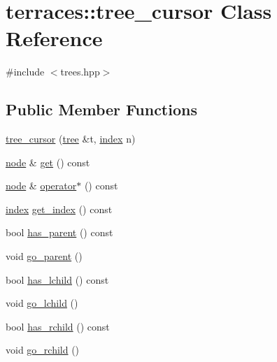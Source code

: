 \hypertarget{classterraces_1_1tree__cursor}{}\section{terraces\+:\+:tree\+\_\+cursor Class Reference}
\label{classterraces_1_1tree__cursor}


{\ttfamily \#include $<$trees.\+hpp$>$}

\subsection*{Public Member Functions}
\begin{DoxyCompactItemize}
\item 
\hyperlink{classterraces_1_1tree__cursor_a454b86381c2e608f22d304b9a33d547c}{tree\+\_\+cursor} (\hyperlink{namespaceterraces_a07aaf7feec4a22c6cdefc14c5a81bdd0}{tree} \&t, \hyperlink{namespaceterraces_adbc33ccb543d1634e96d0eb02e472c77}{index} n)
\item 
\hyperlink{structterraces_1_1node}{node} \& \hyperlink{classterraces_1_1tree__cursor_aa84ad70d2231d809fb8730aea10c95e6}{get} () const
\item 
\hyperlink{structterraces_1_1node}{node} \& \hyperlink{classterraces_1_1tree__cursor_a992f9c4a4cf22b17f3908b2c39105f75}{operator$\ast$} () const
\item 
\hyperlink{namespaceterraces_adbc33ccb543d1634e96d0eb02e472c77}{index} \hyperlink{classterraces_1_1tree__cursor_af39b58768f4089f40919f107b2f85fa6}{get\+\_\+index} () const
\item 
bool \hyperlink{classterraces_1_1tree__cursor_ab34a83b29a7efed72b68aeb8623c1683}{has\+\_\+parent} () const
\item 
void \hyperlink{classterraces_1_1tree__cursor_a752d1a745ac3f5d9154cfc9cb307d465}{go\+\_\+parent} ()
\item 
bool \hyperlink{classterraces_1_1tree__cursor_aa9e8dc765ff85396ea388d8b77508a3c}{has\+\_\+lchild} () const
\item 
void \hyperlink{classterraces_1_1tree__cursor_ae6a8003188359d5bf8a68122ceadca4a}{go\+\_\+lchild} ()
\item 
bool \hyperlink{classterraces_1_1tree__cursor_aae66758d673a56247ffaca3628010013}{has\+\_\+rchild} () const
\item 
void \hyperlink{classterraces_1_1tree__cursor_ad27d7104eef00ab36a17e783705ec136}{go\+\_\+rchild} ()
\end{DoxyCompactItemize}


